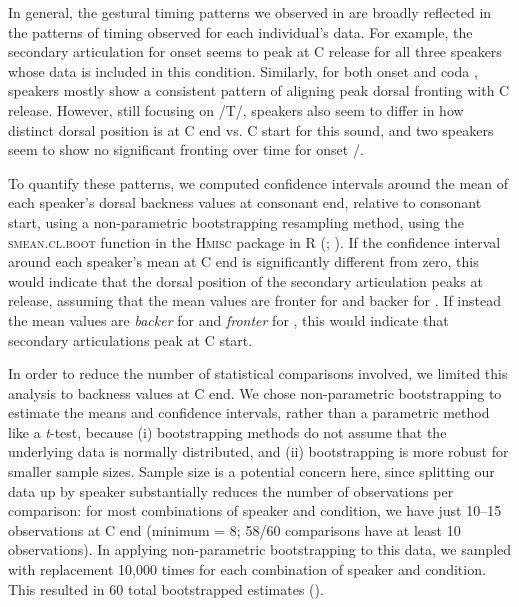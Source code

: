 \documentclass[output=paper,colorlinks,citecolor=brown]{langscibook}
\newcommand{\pal}{\ipa{ʲ}}
\newcommand{\vel}{\ipa{ˠ}}
\begin{document}
In general, the gestural timing patterns we observed in  are broadly reflected in the patterns of timing observed for each individual's data. For example, the secondary articulation for onset \ipa{/K\pal/} seems to peak at C release for all three speakers whose data is included in this condition. Similarly, for both onset and coda \ipa{/T\pal/}, speakers mostly show a consistent pattern of aligning peak dorsal fronting with C release. However, still focusing on /T\pal/, speakers also seem to differ in how distinct dorsal position is at C end vs. C start for this sound, and two speakers seem to show no significant fronting over time for onset \ipa{/T\pal}/.

To quantify these patterns, we computed confidence intervals around the mean of each speaker's dorsal backness values at consonant end, relative to consonant start, using a non-parametric bootstrapping resampling method, using the \textsc{smean.cl.boot} function in the \textsc{Hmisc} package in \textsc{R} (\cite{Hmisc}; \cite{RStats}). If the confidence interval around each speaker's mean at C end is significantly different from zero, this would indicate that the dorsal position of the secondary articulation peaks at release, assuming that the mean values are fronter for \ipa{/C\pal/} and backer for \ipa{/C\vel/}. If instead the mean values are \emph{backer} for \ipa{/C\pal/} and \emph{fronter} for \ipa{/C\vel/}, this would indicate that secondary articulations peak at C start.

In order to reduce the number of statistical comparisons involved, we limited this analysis to backness values at C end. We chose non-parametric bootstrapping to estimate the means and confidence intervals, rather than a parametric method like a \emph{t}-test, because (i) bootstrapping methods do not assume that the underlying data is normally distributed, and (ii) bootstrapping is more robust for smaller sample sizes. Sample size is a potential concern here, since splitting our data up by speaker substantially reduces the number of observations per comparison: for most combinations of speaker and condition, we have just 10--15 observations at C end (minimum = 8; 58/60 comparisons have at least 10 observations). In applying non-parametric bootstrapping to this data, we sampled with replacement 10,000 times for each combination of speaker and condition. This resulted in 60 total bootstrapped estimates ().
\end{document}
